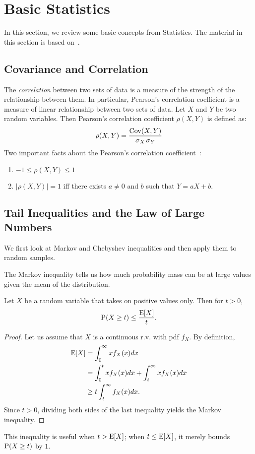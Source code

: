 \chapter{Basic Statistics}
In this section, we review some basic concepts from Statistics. The material 
in this section is based on~\cite{DegSch}.

\section{Covariance and Correlation}

The \emph{correlation} between two sets of data is a measure of the strength of
the relationship between them. In particular, Pearson's correlation coefficient
is a measure of linear relationship between two sets of data. Let $X$ and $Y$
be two random variables. Then Pearson's correlation coefficient $\rho(X, Y)$ is
defined as:
\begin{equation}
    \rho(X, Y) = \frac{\operatorname{Cov}(X, Y)}{\operatorname{\sigma}_X \operatorname{\sigma}_Y} 
\end{equation}  
Two important facts about the Pearson's correlation coefficient~\cite{CasBer}:
\begin{enumerate}
	\item $-1 \leq \rho(X, Y) \leq 1$
	\item $|\rho(X, Y)| = 1$ iff there exists $a \neq 0$ and $b$ such that 
	$Y = aX + b$.
\end{enumerate}

\section{Tail Inequalities and the Law of Large Numbers}
We first look at Markov and Chebyshev inequalities and then apply them to 
random samples.

The Markov inequality tells us how much probability mass can be at large 
values given the mean of the distribution.  
\begin{theorem}\label{thm:stats:markov_ineq}
Let $X$ be a random variable that takes on positive values only. Then for $t > 0$,
\begin{equation} \label{ineq:markov}
    \operatorname{P} (X \geq t) \leq \frac{\operatorname{E} [X]}{t}.
\end{equation}
\end{theorem}
\begin{proof}
Let us assume that $X$ is a continuous r.v. with pdf $f_X$. By definition, 
\begin{align*}
    \operatorname{E} [X] & = \int_{0}^{\infty} x f_X(x) dx \\
           & = \int_{0}^{t} x f_X(x) dx + \int_{t}^{\infty} x f_X(x) dx \\
           & \geq t \int_{t}^{\infty} f_X(x) dx.
\end{align*} 
Since $t > 0$, dividing both sides of the last inequality yields the Markov
inequality.
\end{proof}
\noindent This inequality is useful when $t > \operatorname{E} [X]$; when $t \leq \operatorname{E} [X]$, it merely
bounds $\operatorname{P} (X \geq t)$ by $1$. 

